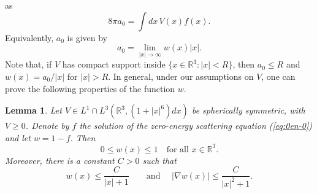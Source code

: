 \documentclass[11pt,a4paper]{article}
\newtheorem{lem}[thm]{Lemma}
\newcommand{\bR}{{\mathbb R}}
\begin{document}
as
\[
  8 \pi a_0 = \int dx \, V(x) f(x).
\]
Equivalently, $a_0$ is given by 
\[
  a_0 = \lim_{|x| \to \infty} w(x)|x|.
\]
Note that, if $V$ has compact support inside $\{ x \in \bR^3 : |x| < R \}$, then $a_0 \leq R$ and $w(x) = a_0/|x|$ for $|x| > R$. In general, under our assumptions on $V$, one can prove the following properties of the function $w$.
\begin{lem}\label{lm:w}
Let $V \in L^1 \cap L^3(\bR^3, (1+|x|^6)dx)$ be spherically symmetric, with
$V \geq 0$. Denote by $f$ the solution of the zero-energy scattering
equation (\ref{eq:0en-0}) and let $w = 1 - f$. Then 
\[ 0 \leq w(x) \leq 1 \quad \text{for all } x \in \bR^3. \]
Moreover, there is a constant $C>0$ such that
\begin{equation}\label{eq:bdw} w(x) \leq \frac{C}{|x|+1} \qquad \text{and } \quad  |\nabla w (x)| \leq \frac{C}{|x|^2 + 1}. \end{equation}
\end{lem}
\end{document}
